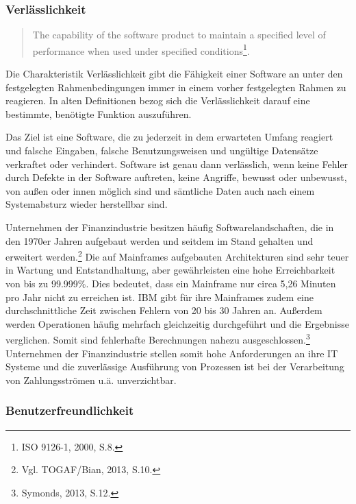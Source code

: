         \subsubsection{Verlässlichkeit}

            \begin{quote}
              The capability of the software product to maintain a specified level of performance when used under specified conditions\footnote{ISO 9126-1, 2000, S.8.}.
            \end{quote}

            Die Charakteristik Verlässlichkeit gibt die Fähigkeit einer Software an unter den festgelegten Rahmenbedingungen immer in einem vorher festgelegten Rahmen zu reagieren. In alten Definitionen bezog sich die Verlässlichkeit darauf eine bestimmte, benötigte Funktion auszuführen.

            Das Ziel ist eine Software, die zu jederzeit in dem erwarteten Umfang reagiert und falsche Eingaben, falsche Benutzungsweisen und ungültige Datensätze verkraftet oder verhindert. Software ist genau dann verlässlich, wenn keine Fehler durch Defekte in der Software auftreten, keine Angriffe, bewusst oder unbewusst, von außen oder innen möglich sind und sämtliche Daten auch nach einem Systemabsturz wieder herstellbar sind.

            Unternehmen der Finanzindustrie besitzen häufig Softwarelandschaften, die in den 1970er Jahren aufgebaut werden und seitdem im Stand gehalten und erweitert werden.\footnote{Vgl. TOGAF/Bian, 2013, S.10.} Die auf Mainframes aufgebauten Architekturen sind sehr teuer in Wartung und Entstandhaltung, aber gewährleisten eine hohe Erreichbarkeit von bis zu 99.999\%. Dies bedeutet, dass ein Mainframe nur circa 5,26 Minuten pro Jahr nicht zu erreichen ist. IBM gibt für ihre Mainframes zudem eine durchschnittliche Zeit zwischen Fehlern von 20 bis 30 Jahren an. Außerdem werden Operationen häufig mehrfach gleichzeitig durchgeführt und die Ergebnisse verglichen. Somit sind fehlerhafte Berechnungen nahezu ausgeschlossen.\footnote{Symonds, 2013, S.12.} Unternehmen der Finanzindustrie stellen somit hohe Anforderungen an ihre IT Systeme und die zuverlässige Ausführung von Prozessen ist bei der Verarbeitung von Zahlungsströmen u.ä. unverzichtbar.

        \subsubsection{Benutzerfreundlichkeit}


